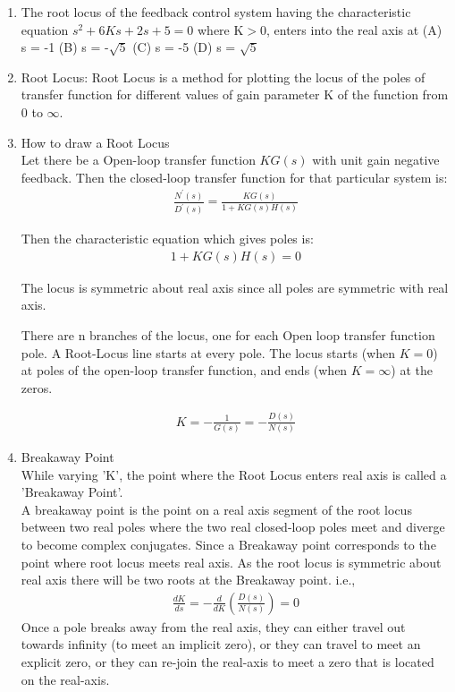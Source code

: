 \begin{enumerate}[label=\thesection.\arabic*.,ref=\thesection.\theenumi]
\item The root locus of the feedback control system having the characteristic equation $ s^2 + 6Ks + 2s + 5 = 0 $ where
K$>$0, enters into the real axis at
\bigbreak
(A) s = -1
\bigbreak
(B) s = -$\sqrt{5}$
\bigbreak
(C) s = -5
\bigbreak
(D) s = $\sqrt{5}$


\solution

\item Root Locus:
	  Root Locus is a method for plotting the locus of the poles of transfer function for different values of gain parameter K of the function from 0 to $\infty$.

\item How to draw a Root Locus	\\
     Let there be a Open-loop transfer function  $KG(s)$  with unit gain negative feedback. Then the closed-loop transfer function for that particular system is:
    \begin{align}
         \frac{N^{'}(s)}{D^{'}(s)}=\frac{K G(s)}{1+K G(s) H(s)}    
    \end{align}
    
     Then the characteristic equation which gives poles is: 
    \begin{align}
        1+KG(s)H(s)=0
    \end{align}
    
     The locus is symmetric about real axis since all poles are symmetric with real axis.
     
    There are n branches of the locus, one for each Open loop transfer function pole. A Root-Locus line starts at every pole. The locus starts (when $K = 0$) at poles of the open-loop transfer function, and ends (when $K = \infty$) at the zeros.
    
    
    \begin{align}
        K=-\frac{1}{G(s)}=-\frac{D(s)}{N(s)}    
    \end{align}

\item Breakaway Point \\
    While varying 'K', the point where the Root Locus enters real axis is called a 'Breakaway Point'. \\
A breakaway point is the point on a real axis segment of the root locus between two real poles where the two real closed-loop poles meet and diverge to become complex conjugates. Since a Breakaway point corresponds to the point where root locus meets real axis. As the root locus is symmetric about real axis there will be two roots at the Breakaway point. 
i.e.,
    \begin{align}
        \frac{d K}{d s}=-\frac{d}{d K}\left(\frac{D(s)}{N(s)}\right)=0 
    \end{align}
    Once a pole breaks away from the real axis, they can either travel out towards infinity (to meet an implicit zero), or they can travel to meet an explicit zero, or they can re-join the real-axis to meet a zero that is located on the real-axis. 


\end{enumerate}
